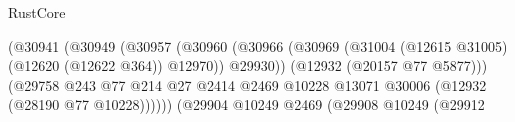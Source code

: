 \begin{lexlean}{RustCore}
\begin{coremodule}
                                                                    (@30941
                                                                      (@30949
                                                                        (@30957
                                                                          (@30960
                                                                            (@30966
                                                                              (@30969
                                                                                (@31004
                                                                                  (@12615 @31005)
                                                                                  (@12620
                                                                                    (@12622 @364))
                                                                                  @12970))
                                                                              @29930))
                                                                          (@12932
                                                                            (@20157 @77 @5877)))
                                                                        (@29758
                                                                          @243
                                                                          @77
                                                                          @214
                                                                          @27
                                                                          @2414
                                                                          @2469
                                                                          @10228
                                                                          @13071
                                                                          @30006
                                                                          (@12932
                                                                            (@28190 @77 @10228))))))
                                                                  (@29904
                                                                    @10249
                                                                    @2469
                                                                    (@29908
                                                                      @10249
                                                                      (@29912

\end{coremodule}
\end{lexlean}
